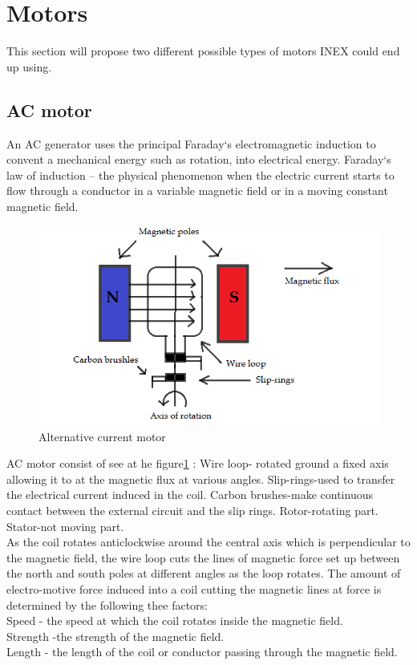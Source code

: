 \section{Motors}
This section will propose two different possible types of motors INEX could end up using.

\subsection{AC motor}
An AC generator uses the principal Faraday‘s electromagnetic induction to convent a mechanical energy such as rotation, into electrical energy. Faraday‘s law of induction – the physical phenomenon when the electric current starts to flow through a conductor in a variable magnetic field or in a moving constant magnetic field. \\

\begin{figure}[h]
    \centering
    \includegraphics[width=.7\textwidth]{figures/Alternative_current_(AC).png}
    \caption{Alternative current motor } 
    \label{fig:ACmotor} 
\end{figure}

AC motor consist of see at he figure\ref{fig:ACmotor} : Wire loop- rotated ground a fixed axis allowing it to at the magnetic flux at various angles.
Slip-rings-used to transfer the electrical current induced in the coil.
Carbon brushes-make continuous contact between the external circuit and the slip rings.
Rotor-rotating part.
Stator-not moving part.\\
As the coil rotates anticlockwise around the central axis which is perpendicular to the magnetic field, the wire loop cuts the lines of magnetic force set up between the north and south poles at different angles as the loop rotates.
The amount of electro-motive force induced into a coil cutting the magnetic lines at force is determined by the following thee factors:\\
Speed - the speed at which the coil rotates inside the magnetic field.\\
Strength -the strength of the magnetic field.\\
Length - the length of the coil or conductor passing through the magnetic field.\\

